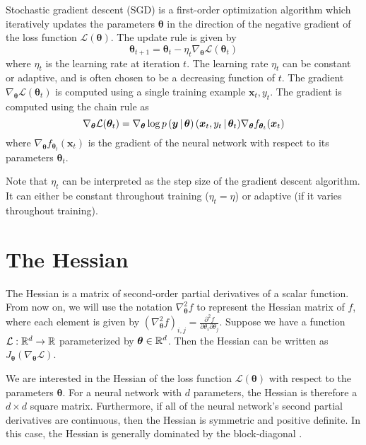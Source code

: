Stochastic gradient descent (SGD) is a first-order optimization algorithm which iteratively updates the parameters \(\bm\theta\) in the direction of the negative gradient of the loss function \(\mathcal{L}(\bm\theta)\).
The update rule is given by
%
\begin{equation*}
    \bm\theta_{t+1} = \bm\theta_t - \eta_t \nabla_{\bm\theta} \mathcal{L}(\bm\theta_t)
\end{equation*}
%
where \(\eta_t\) is the learning rate at iteration \(t\).
The learning rate \(\eta_t\) can be constant or adaptive, and is often chosen to be a decreasing function of \(t\).
The gradient \(\nabla_{\bm\theta} \mathcal{L}(\bm\theta_t)\) is computed using a single training example \(\bm x_t, y_t\).
The gradient is computed using the chain rule as
%
\begin{equation*}
    \nabla_{\bm\theta} \mathcal{L}(\bm\theta_t) = \nabla_{\bm\theta} \log p\left(\bm y \, | \, \bm \theta\right)(\bm x_t, y_t \, | \, \bm\theta_t) \nabla_{\bm\theta} f_{\bm\theta_t}(\bm x_t)
\end{equation*}
%
where \(\nabla_{\bm\theta} f_{\bm\theta_t}(\bm x_t)\) is the gradient of the neural network with respect to its parameters \(\bm\theta_t\).

Note that \(\eta_t\) can be interpreted as the step size of the gradient descent algorithm.
It can either be constant throughout training (\(\eta_t = \eta\)) or adaptive (if it varies throughout training).

\section{The Hessian}

The Hessian is a matrix of second-order partial derivatives of a scalar function.
From now on, we will use the notation \(\nabla^2_{\bm\theta} f\) to represent the Hessian matrix of \(f\), where each element is given by \(\left(\nabla^2_{\bm\theta} f\right)_{i, j} = \frac{\partial^2 f}{\partial\theta_i \partial\theta_j}\).
Suppose we have a function \(\mathcal{L}: \mathbb{R}^d \rightarrow \mathbb{R}\) parameterized by \(\bm \theta \in \mathbb{R}^d\).
Then the Hessian can be written as \(J_{\bm \theta}(\nabla_{\bm\theta} \mathcal{L})\).

We are interested in the Hessian of the loss function \(\mathcal{L}(\bm\theta)\) with respect to the parameters \(\bm\theta\).
For a neural network with \(d\) parameters, the Hessian is therefore a \(d \times d\) square matrix.
Furthermore, if all of the neural network's second partial derivatives are continuous, then the Hessian is symmetric and positive definite.
In this case, the Hessian is generally dominated by the block-diagonal \cite{martens2015optimizing}.

